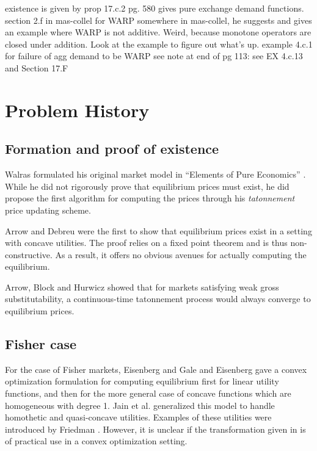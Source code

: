 \documentclass[12pt]{article}
\begin{document}

existence is given by prop 17.c.2
pg. 580 gives pure exchange demand functions.
section 2.f in mas-collel for WARP
somewhere in mas-collel, he suggests and gives an example where
WARP is not additive. Weird, because monotone operators are closed under addition.
Look at the example to figure out what's up.
example 4.c.1 for failure of agg demand to be WARP
see note at end of pg 113: see EX 4.c.13 and Section 17.F



\section{Problem History}
\subsection{Formation and proof of existence}
Walras formulated his original market model in ``Elements of Pure Economics''
\cite{walras1896elements}. While he did not rigorously prove that equilibrium
prices must exist, he did propose the first algorithm for computing the prices
through his \emph{tatonnement} price updating scheme.

Arrow and Debreu \cite{arrow1954existence} were the first to show that
equilibrium prices exist in a setting with concave utilities.
The proof relies on a fixed point theorem and is thus non-constructive.
As a result, it offers no obvious avenues for actually computing the
equilibrium.

Arrow, Block and Hurwicz \cite{arrow1959stability} showed that for markets
satisfying weak gross substitutability, a continuous-time tatonnement process
would always converge to equilibrium prices.


\subsection{Fisher case}
For the case of Fisher markets,
Eisenberg and Gale \cite{eisenberg1959consensus, gale1960theory} and
Eisenberg \cite{eisenberg1961aggregation} gave a convex optimization
formulation for computing equilibrium first for linear utility functions,
and then for the more general case of concave functions which are homogeneous
with degree 1.
Jain et al. \cite{jain2005market} generalized this model to handle homothetic
and quasi-concave utilities.
Examples of these utilities were introduced by Friedman
\cite{friedman1973concavity}.
However, it is unclear if the transformation given in
\cite{jain2005market} is of practical use in a convex optimization setting.
\end{document}
